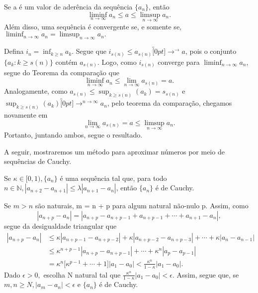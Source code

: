\documentclass[Analysis/analysis_notes.tex]{subfiles}
\begin{document}
\begin{theorem*}
	Se a \'e um valor de ader\^encia da sequ\^encia $\{a_{n}\} $, ent\~ao
	$$
		\liminf_{n\to\infty}a_{n}\leq{a}\leq{\limsup_{n\to\infty}a_{n}}.
	$$
	Al\'em disso, uma sequ\^encia \'e convergente se, e somente se, $\liminf_{n\to\infty}a_{n} = \limsup_{n\to\infty}a_{n}.$
\end{theorem*}
\begin{proof*}
	Defina $i_{n} = \inf_{k\geq{n}}a_{k}$. Segue que $i_{s(n)}\leq{a_{s(n)}}\overbracket[0pt]{\longrightarrow}^{\to }a$, pois o conjunto
	$\{a_{k}: k\geq{s(n)}\}$ cont\'em $a_{s(n)}$. Logo, como $i_{s(n)}$ converge para $\liminf_{n\to\infty}a_{n}$, segue do Teorema da compara\c c\~ao que
	$$
		\liminf_{n\to\infty}a_{n} \leq{\lim_{n\to\infty}a_{s(n)} = a}.
	$$
	Analogamente, como $a_{s(n)}\leq{\sup_{k\geq{s(n)}}{(a_{k})}} = s_{s(n)}$ e $\sup_{k\geq{s(n)}}{(a_{k})}\overbracket[0pt]{\longrightarrow}^{n\to\infty}a_{n}$,
	pelo teorema da compara\c c\~ao, chegamos novamente em
	$$
		\lim_{n\to\infty}a_{s(n)} = a \leq{\limsup_{n\to\infty}a_{n}}.
	$$
	Portanto, juntando ambos, segue o resultado. \qedsymbol
\end{proof*}
A seguir, mostraremos um m\'etodo para aproximar n\'umeros por meio de sequ\^encias de Cauchy.
\begin{theorem*}
	Se $\kappa\in{[0, 1)},\{a_{n}\} $ \'e uma sequ\^encia tal que, para todo $n\in \mathbb{N}, |a_{n+2}-a_{n+1}|\leq{\lambda|a_{n+1}-a_{n}|}$,
	ent\~ao $\{a_{n}\} $ \'e de Cauchy.
\end{theorem*}
\begin{proof*}
	Se $m > n$ s\~ao naturais, m = n + p para algum natural n\~ao-nulo p. Assim, como
	$$
		|a_{n+p} - a_{n}| = |a_{n+p} - a_{n+p-1} + a_{n+p-1}+\cdots + a_{n+1} - a_{n}|,
	$$
	segue da desigualdade triangular que
	\begin{align*}
		|a_{n+p}-a_{n}| & \leq{\kappa|a_{n+p-1}-a_{n+p-2}|+\kappa|a_{n+p-2}-a_{n+p-3}|+\cdots+\kappa|a_{n}-a_{n-1}|}                \\
		                & \leq{\kappa^{n+p-1}|a_{n+p} - a_{n+p-1}|}+\cdots+{\kappa^{n}|a_{p}-a_{p-1}|}                              \\
		                & ={\kappa^{n}\biggl[\kappa^{p-1}+\cdots+1\biggr]}|a_{1}-a_{0}| < \frac{\kappa^{n}}{1-\kappa}|a_{1}-a_{0}|.
	\end{align*}
	Dado $\epsilon > 0,$ escolha N natural tal que $\displaystyle \frac{\kappa^{n}}{1-\kappa}|a_{1}-a_{0}| < \epsilon.$ Assim, segue que,
	se $m, n\geq{N}, |a_{m}-a_{n}|<\epsilon$ e $\{a_{n}\} $ \'e de Cauchy. \qedsymbol
\end{proof*}
\end{document}
